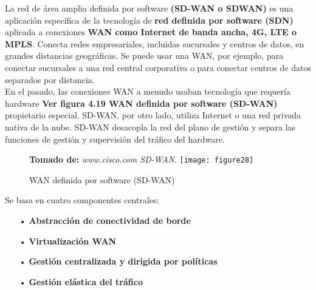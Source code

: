 La red de área amplia definida por software \textbf{(SD-WAN o SDWAN)} es una aplicación específica de la tecnología de \textbf{red definida por software (SDN)} aplicada a conexiones \textbf{WAN como Internet de banda ancha, 4G, LTE o MPLS}.
Conecta redes empresariales, incluidas sucursales y centros de datos, en grandes distancias geográficas. Se puede usar una WAN, por ejemplo, para conectar sucursales a una red central corporativa o para conectar centros de datos separados por distancia.
\\
En el pasado, las conexiones WAN a menudo usaban tecnología que requería hardware  \textbf{Ver figura 4.19 WAN definida por software (SD-WAN)} propietario especial. SD-WAN, por otro lado, utiliza Internet o una red privada nativa de la nube. SD-WAN desacopla la red del plano de gestión y separa las funciones de gestión y supervisión del tráfico del hardware. 
\begin{figure}[htbp]
 \textbf{Tomado de:} \textit{www.cisco.com SD-WAN}.
  \centering
    {\texttt{[image: figure28]}}
  \caption{WAN definida por software (SD-WAN)}
  \label{fig:fig2subfig}
\end{figure}

Se basa en cuatro componentes centrales:

\begin{itemize}
\item[•]\textbf{Abstracción de conectividad de borde}
\item[•]\textbf{Virtualización WAN}
\item[•]\textbf{Gestión centralizada y dirigida por políticas}
\item[•]\textbf{Gestión elástica del tráfico}
\end{itemize}
